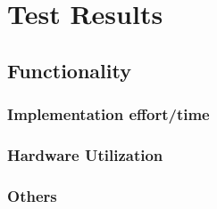 \chapter{Test Results}
\label{cha:Results}
  \section{Functionality}
  \subsection{Implementation effort/time}
  \subsection{Hardware Utilization}
  \subsection{Others}

